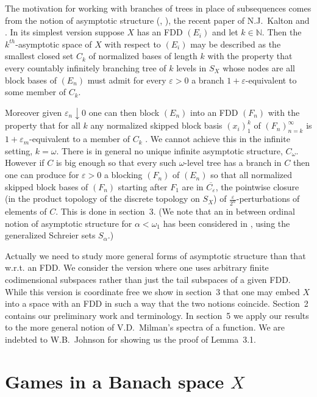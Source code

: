 \documentclass[11pt,leqno]{amsart}
\theoremstyle{definition}
\newcommand{\vp}{\varepsilon}
\newcommand{\N}{\mathbb{N}}
\begin{document}
The motivation for working with branches of trees in place of subsequences 
comes from the notion of asymptotic structure (\cite{MT}, \cite{MMT}),  
the recent paper of N.J.~Kalton \cite{K} and \cite{KOS}. 
In its simplest version suppose $X$ has an FDD $(E_i)$ and let $k\in\N$. 
Then the $k^{th}$-asymptotic space of $X$ with 
respect to $(E_i)$ may be described
as the smallest closed set $C_k$ of normalized bases of length $k$ with 
the property that every countably infinitely branching tree of $k$ levels 
in $S_X$ whose nodes are all block bases of $(E_n)$ must admit for every 
$\vp>0$ a branch $1+\vp$-equivalent to some member of $C_k$. 

Moreover given $\vp_n\downarrow0$ one can then block $(E_n)$ into an FDD 
$(F_n)$ with the property that for all $k$ any normalized skipped block 
basis $(x_i)_1^k$ of $(F_n)_{n=k}^\infty$ is $1+\vp_m$-equivalent to 
a member of $C_k$ \cite{KOS}. 
We cannot achieve this in the infinite setting, $k=\omega$. 
There is in general no unique infinite asymptotic structure, $C_\omega$. 
However if $C$ is big enough so that every such $\omega$-level tree has a 
branch in $C$ then one can produce for $\vp>0$ a blocking $(F_n)$ of $(E_n)$ 
so that all normalized skipped block bases of $(F_n)$ starting after $F_1$ 
are in $\overline{C_{\vp}}$, the pointwise closure (in the product topology 
of the discrete topology on $S_X$) of 
$\frac{\vp}{2^n}$-perturbations of elements of $C$. 
This is done in section~3.  
(We note that an in between 
ordinal notion of asymptotic structure for $\alpha<\omega_1$ has been 
considered in \cite{W}, using the generalized Schreier sets $S_\alpha$.) 

Actually we need to study more general forms of asymptotic structure than 
that w.r.t. an FDD. 
We consider the version where one uses arbitrary finite codimensional 
subspaces rather than just the tail subspaces of a given FDD. 
While this version is coordinate free we show in section~3 that one may 
embed $X$ into a space with an FDD in such a way that the two notions coincide. 
Section~2 contains our preliminary work and terminology. 
In section~5 we apply our results to the more general notion of V.D.~Milman's 
\cite{Mi}  spectra of a function. 
We are indebted to W.B.~Johnson for showing us the proof of Lemma~3.1.


\section{Games in a Banach space $X$}\label{S1}
\end{document}
